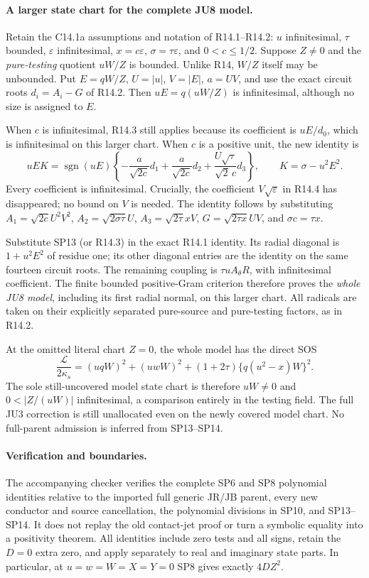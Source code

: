 \paragraph{A larger state chart for the complete JU8 model.}
Retain the C14.1a assumptions and notation of R14.1--R14.2:
$u$ infinitesimal, $\tau$ bounded, $\varepsilon$ infinitesimal,
$x=c\varepsilon$, $\sigma=\tau\varepsilon$, and $0<c\le1/2$.
Suppose $Z\ne0$ and the \emph{pure-testing} quotient
$uW/Z$ is bounded. Unlike R14, $W/Z$ itself may be unbounded.
Put $E=qW/Z$, $U=|u|$, $V=|E|$, $a=UV$, and use the exact
circuit roots $d_i=A_i-G$ of R14.2. Then $uE=q(uW/Z)$ is
infinitesimal, although no size is assigned to $E$.

When $c$ is infinitesimal, R14.3 still applies because its coefficient
is $uE/d_0$, which is infinitesimal on this larger chart.
When $c$ is a positive unit, the new identity is
\[
 uEK=\operatorname{sgn}(uE)\left\{
       -\frac{a}{\sqrt{2c}}d_1
       +\frac{a}{\sqrt{2c}}d_2
       +\frac{U\sqrt\tau}{\sqrt2\,c}d_3\right\},
 \qquad K=\sigma-u^2E^2.
 \tag{SP13}
\]
Every coefficient is infinitesimal. Crucially, the coefficient
$V\sqrt\varepsilon$ in R14.4 has disappeared; no bound on $V$ is
needed. The identity follows by substituting
$A_1=\sqrt{2c}U^2V^2$, $A_2=\sqrt{2\sigma\tau}U$,
$A_3=\sqrt{2\tau}xV$, $G=\sqrt{2\tau x}UV$,
and $\sigma c=\tau x$.

Substitute SP13 (or R14.3) in the exact R14.1 identity. Its radial
diagonal is $1+u^2E^2$ of residue one; its other diagonal entries
are the identity on the same fourteen circuit roots. The remaining
coupling is $\tau uA_\theta R$, with infinitesimal coefficient.
The finite bounded positive-Gram criterion therefore proves the
\emph{whole JU8 model}, including its first radial normal, on this
larger chart. All radicals are taken on their explicitly separated
pure-source and pure-testing factors, as in R14.2.

At the omitted literal chart $Z=0$, the whole model has the direct SOS
\[
 \frac{\mathcal L}{2\kappa_s}
   =(uqW)^2+(uwW)^2+(1+2\tau)\{q(u^2-x)W\}^2.
 \tag{SP14}
\]
The sole still-uncovered model state chart is therefore
$uW\ne0$ and $0<|Z/(uW)|$ infinitesimal, a comparison entirely in
the testing field. The full JU3 correction is still unallocated
even on the newly covered model chart. No full-parent admission is
inferred from SP13--SP14.

\paragraph{Verification and boundaries.}
The accompanying checker verifies the complete SP6 and SP8 polynomial
identities relative to the imported full generic JR/JB parent, every
new conductor and source cancellation, the polynomial divisions in
SP10, and SP13--SP14. It does not replay the old contact-jet proof or
turn a symbolic equality into a positivity theorem. All identities
include zero tests and all signs, retain the $D=0$ extra zero, and
apply separately to real and imaginary state parts. In particular,
at $u=w=W=X=Y=0$ SP8 gives exactly $4DZ^2$.


